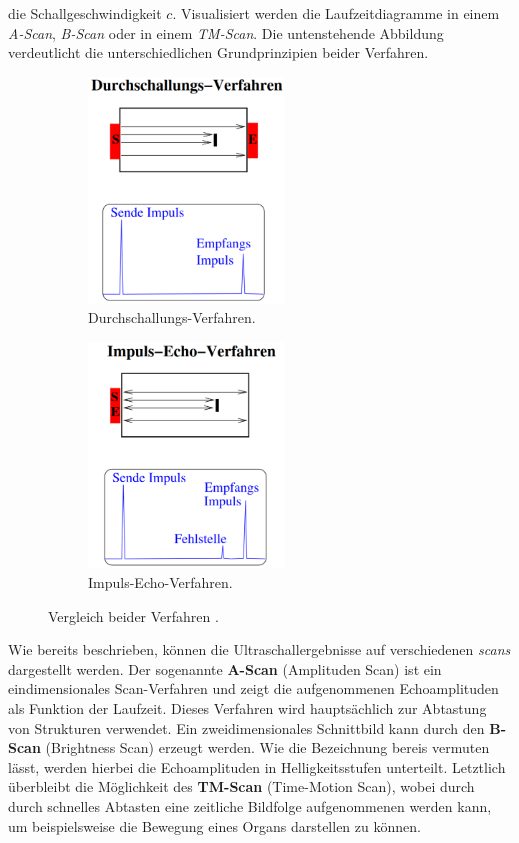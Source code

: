\noindent die Schallgeschwindigkeit $c$. Visualisiert werden die Laufzeitdiagramme in einem \emph{A-Scan}, \emph{B-Scan} oder in 
einem \emph{TM-Scan}. Die untenstehende Abbildung verdeutlicht die unterschiedlichen Grundprinzipien beider Verfahren.

\begin{figure}
    \begin{subfigure}{0.48\textwidth}
        \centering
        \includegraphics[height=6cm]{content/Durchschallung.png}
        \caption{Durchschallungs-Verfahren.}
        \label{fig:DSV}
    \end{subfigure}
    \hfill
    \begin{subfigure}{0.48\textwidth}
        \centering 
        \includegraphics[height=6cm]{content/Impuls_Echo.png}
        \caption{Impuls-Echo-Verfahren.}
        \label{fig:IEV}
    \end{subfigure}
    \caption{Vergleich beider Verfahren \cite{Versuchsanleitung_US2}.}
    \label{fig:Vergleich}
\end{figure}

\noindent Wie bereits beschrieben, können die Ultraschallergebnisse auf verschiedenen \emph{scans} dargestellt werden.
Der sogenannte \textbf{A-Scan} (Amplituden Scan) ist ein eindimensionales Scan-Verfahren und zeigt die aufgenommenen 
Echoamplituden als Funktion der Laufzeit. Dieses Verfahren wird hauptsächlich zur Abtastung von Strukturen verwendet.
Ein zweidimensionales Schnittbild kann durch den \textbf{B-Scan} (Brightness Scan) erzeugt werden. Wie die Bezeichnung 
bereis vermuten lässt, werden hierbei die Echoamplituden in Helligkeitsstufen unterteilt. Letztlich überbleibt die 
Möglichkeit des \textbf{TM-Scan} (Time-Motion Scan), wobei durch durch schnelles Abtasten eine zeitliche Bildfolge 
aufgenommenen werden kann, um beispielsweise die Bewegung eines Organs darstellen zu können.

